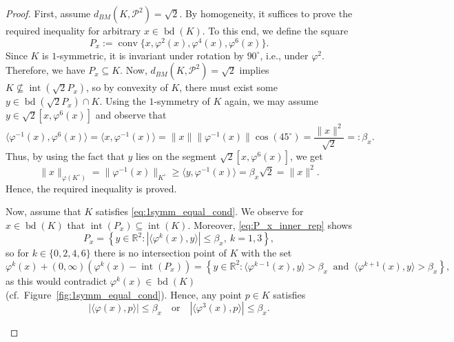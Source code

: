 \documentclass[12pt,a4paper]{article}
\theoremstyle{definition}
\DeclareMathOperator{\conv}{conv}
\DeclareMathOperator{\bd}{bd}
\DeclareMathOperator{\inte}{int}
\newcommand\R{\mathbb{R}}
\newcommand\CP{\mathcal{P}}
\begin{document}
\begin{proof}
First, assume $d_{BM}(K,\CP^2) = \sqrt{2}$. By homogeneity, it suffices to prove the required inequality for arbitrary $x \in \bd(K)$. To this end, we define the square
$$ P_x := \conv\{ x, \varphi^2(x), \varphi^4(x), \varphi^6(x) \}. $$
Since $K$ is $1$-symmetric, it is invariant under rotation by $90^\circ$, i.e., under $\varphi^2$. Therefore, we have $P_x \subseteq K$. Now, $d_{BM}(K,\CP^2) = \sqrt{2}$ implies $K \not\subseteq \inte(\sqrt{2} P_x)$, so by convexity of $K$, there must exist some $y \in \bd(\sqrt{2} P_x) \cap K$. Using the $1$-symmetry of $K$ again, we may assume $y \in \sqrt{2} [x,\varphi^6(x)]$ and observe that
\begin{equation}
\label{eq:P_x_inner_rep}
\langle \varphi^{-1}(x), \varphi^6(x) \rangle = \langle x, \varphi^{-1}(x) \rangle = \|x\| \|\varphi^{-1}(x)\| \cos(45^\circ) = \frac{\|x\|^2}{\sqrt{2}} =: \beta_x.
\end{equation}
Thus, by using the fact that $y$ lies on the segment $\sqrt{2} [x,\varphi^6(x)]$, we get
$$ \|x\|_{\varphi(K^\circ)} = \|\varphi^{-1}(x)\|_{K^\circ} \geq \langle y, \varphi^{-1}(x) \rangle = \beta_x \sqrt{2} = \|x\|^2. $$
Hence, the required inequality is proved.

Now, assume that $K$ satisfies \eqref{eq:1symm_equal_cond}. We observe for $x \in \bd(K)$ that $\inte(P_x) \subseteq \inte(K)$. Moreover, \eqref{eq:P_x_inner_rep} shows
$$ P_x = \left\{ y \in \R^2 : |\langle \varphi^k(x), y \rangle| \leq \beta_x, \: k=1,3 \right \}, $$
so for $k \in \{0, 2, 4, 6\}$ there is no intersection point of $K$ with the set
$$ \varphi^k(x) + (0,\infty) (\varphi^k(x) - \inte(P_x)) =\left\{ y \in \R^2 : \langle \varphi^{k-1}(x),y \rangle > \beta_x \: \text{ and } \: \langle \varphi^{k+1}(x), y \rangle > \beta_x \right\}, $$
as this would contradict $\varphi^k(x) \in \bd(K)$ (cf.~Figure~\ref{fig:1symm_equal_cond}). Hence, any point $p \in K$ satisfies
\begin{equation}
\label{eq:P_x_cond}
|\langle \varphi(x), p \rangle| \leq \beta_x
\quad \text{or} \quad
|\langle \varphi^3(x), p \rangle| \leq \beta_x.
\end{equation}



\begin{figure}[ht]
\def\scale{0.9}
%
\centering
{}
\end{figure}
\end{proof}
\end{document}
